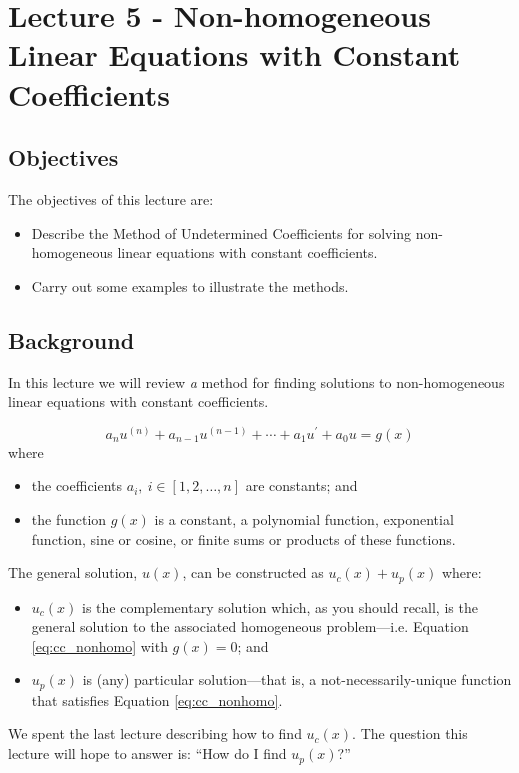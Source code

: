 \chapter{Lecture 5 - Non-homogeneous Linear Equations with Constant Coefficients}
\label{ch:lec5}
\section{Objectives}
The objectives of this lecture are:
\begin{itemize}
\item Describe the Method of Undetermined Coefficients for solving non-homogeneous linear equations with constant coefficients.
\item Carry out some examples to illustrate the methods.
\end{itemize}

\section{Background}
In this lecture we will review \emph{a} method for finding solutions to non-homogeneous linear equations with constant coefficients.

\begin{equation}
a_nu^{(n)} + a_{n-1}u^{(n-1)}+\cdots+a_1u^{\prime}+a_0u = g(x)
\label{eq:cc_nonhomo}
\end{equation}
where
\begin{itemize}
\item the coefficients $a_i, \ i\in [1,2,\dots,n]$ are constants; and
\item the function $g(x)$ is a constant, a polynomial function, exponential function, sine or cosine, or finite sums or products of these functions.
\end{itemize}
The general solution, $u(x)$, can be constructed as $u_c(x)+u_p(x)$ where:
\begin{itemize}
\item $u_c(x)$ is the complementary solution which, as you should recall, is the general solution to the associated homogeneous problem---i.e. Equation \ref{eq:cc_nonhomo} with $g(x)=0$; and
\item $u_p(x)$ is (any) particular solution---that is, a not-necessarily-unique function that satisfies Equation \ref{eq:cc_nonhomo}.
\end{itemize}
We spent the last lecture describing how to find $u_c(x)$.  The question this lecture will hope to answer is: ``How do I find $u_p(x)$?''  
